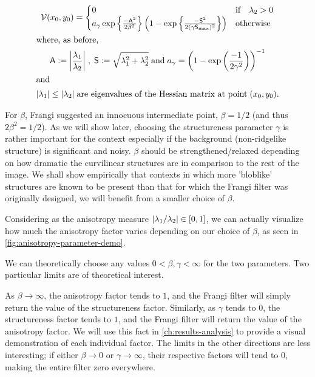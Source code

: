 \begin{gather} \label{eq:V_rescaled}
\V(x_0,y_0) = \begin{cases}
0 & \text{if} \quad \lambda_2 > 0 \\
a_\gamma \exp\left\{\frac{-\Am^2}{2\beta^2}\right\}
\left(1 - \exp\left\{\frac{-\Sm^2}{2(\gamma \Smax)^2}\right\}\right) & \text{otherwise}
\end{cases} \\
\shortintertext{where, as before,}
\Am := \abs*{\frac{\lambda_1}{\lambda_2}}
\;,\;
\Sm := \sqrt{\lambda_1^2 + \lambda_2^2}
\;\textrm{and}\;
a_\gamma = \left(1-\exp\left(\frac{-1}{2\gamma^2}\right)\right)^{-1} \notag\\
\shortintertext{and}
\abs*{\lambda_1} \le \abs*{\lambda_2}
\; \textrm{are eigenvalues of the Hessian matrix at point} \; (x_0, y_0).
\end{gather}

For $\beta$, Frangi suggested an innocuous intermediate point, $\beta=1/2$ (and thus $2\beta^2 = 1/2$).
As we will show later, choosing the structureness parameter $\gamma$ is rather important for the context especially if the background (non-ridgelike structure) is significant and noisy. $\beta$ should be strengthened/relaxed depending on how dramatic the curvilinear structures are in comparison to the rest of the image. We shall show empirically that contexts in which more 'bloblike' structures are known to be present than that for which the Frangi filter was originally designed, we will benefit from a smaller choice of $\beta$.

Considering as the anisotropy measure $\abs*{\lambda_1 / \lambda_2} \in [0,1]$,  we can actually visualize how much the 
anisotropy factor varies depending on our choice of $\beta$, as seen in \cref{fig:anisotropy-parameter-demo}.

We can theoretically choose any values $0 < \beta, \gamma < \infty$ for the two parameters. Two particular limits are of theoretical interest.

As $\beta \to \infty$, the anisotropy factor tends to $1$, and the Frangi filter will simply return the value of the structureness factor. Similarly, as $\gamma$ tends to $0$, the structureness factor tends to $1$, and the Frangi filter will return the value of the anisotropy factor. We will use this fact in \cref{ch:results-analysis} to provide a visual demonstration of each individual factor. The limits in the other directions are less interesting; if either $\beta \to 0$ or $\gamma \to \infty$, their respective factors will tend to $0$, making the entire filter zero everywhere.

